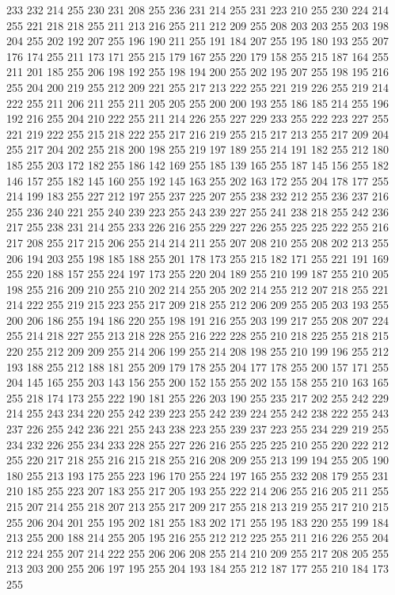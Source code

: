 233 232 214 255 230 231 208 255 236 231 214 255 231 223 210 255 230 224 214 255 221 218 218 255 211 213 216 255 211 212 209 255 208 203 203 255 203 198 204 255 202 192 207 255 196 190 211 255 191 184 207 255 195 180 193 255 207 176 174 255 211 173 171 255
215 179 167 255 220 179 158 255 215 187 164 255 211 201 185 255 206 198 192 255 198 194 200 255 202 195 207 255 198 195 216 255 204 200 219 255 212 209 221 255 217 213 222 255 221 219 226 255 219 214 222 255 211 206 211 255 211 205 205 255 200 200 193 255
186 185 214 255 196 192 216 255 204 210 222 255 211 214 226 255 227 229 233 255 222 223 227 255 221 219 222 255 215 218 222 255 217 216 219 255 215 217 213 255 217 209 204 255 217 204 202 255 218 200 198 255 219 197 189 255 214 191 182 255 212 180 185 255
203 172 182 255 186 142 169 255 185 139 165 255 187 145 156 255 182 146 157 255 182 145 160 255 192 145 163 255 202 163 172 255 204 178 177 255 214 199 183 255 227 212 197 255 237 225 207 255 238 232 212 255 236 237 216 255 236 240 221 255 240 239 223 255
243 239 227 255 241 238 218 255 242 236 217 255 238 231 214 255 233 226 216 255 229 227 226 255 225 225 222 255 216 217 208 255 217 215 206 255 214 214 211 255 207 208 210 255 208 202 213 255 206 194 203 255 198 185 188 255 201 178 173 255 215 182 171 255
221 191 169 255 220 188 157 255 224 197 173 255 220 204 189 255 210 199 187 255 210 205 198 255 216 209 210 255 210 202 214 255 205 202 214 255 212 207 218 255 221 214 222 255 219 215 223 255 217 209 218 255 212 206 209 255 205 203 193 255 200 206 186 255
194 186 220 255 198 191 216 255 203 199 217 255 208 207 224 255 214 218 227 255 213 218 228 255 216 222 228 255 210 218 225 255 218 215 220 255 212 209 209 255 214 206 199 255 214 208 198 255 210 199 196 255 212 193 188 255 212 188 181 255 209 179 178 255
204 177 178 255 200 157 171 255 204 145 165 255 203 143 156 255 200 152 155 255 202 155 158 255 210 163 165 255 218 174 173 255 222 190 181 255 226 203 190 255 235 217 202 255 242 229 214 255 243 234 220 255 242 239 223 255 242 239 224 255 242 238 222 255
243 237 226 255 242 236 221 255 243 238 223 255 239 237 223 255 234 229 219 255 234 232 226 255 234 233 228 255 227 226 216 255 225 225 210 255 220 222 212 255 220 217 218 255 216 215 218 255 216 208 209 255 213 199 194 255 205 190 180 255 213 193 175 255
223 196 170 255 224 197 165 255 232 208 179 255 231 210 185 255 223 207 183 255 217 205 193 255 222 214 206 255 216 205 211 255 215 207 214 255 218 207 213 255 217 209 217 255 218 213 219 255 217 210 215 255 206 204 201 255 195 202 181 255 183 202 171 255
195 183 220 255 199 184 213 255 200 188 214 255 205 195 216 255 212 212 225 255 211 216 226 255 204 212 224 255 207 214 222 255 206 206 208 255 214 210 209 255 217 208 205 255 213 203 200 255 206 197 195 255 204 193 184 255 212 187 177 255 210 184 173 255
